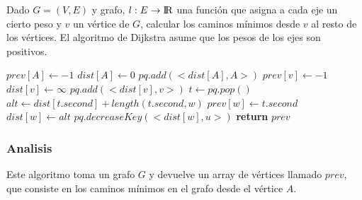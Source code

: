 Dado $G = (V, E)$ y grafo, $l: E \rightarrow {\rm I\!R}$ una funci\'on que asigna a cada eje un cierto peso y $v$ un v\'ertice de $G$, calcular los caminos m\'inimos desde $v$ al resto de los v\'ertices. El algoritmo de Dijkstra asume que los pesos de los ejes son positivos.

\begin{algorithm}
\begin{algorithmic}[1]
  \State $prev[A] \gets -1$
  \State $dist[A] \gets 0$
  \State $pq.add(<dist[A], A>)$
    \State $prev[v] \gets -1$
    \State $dist[v] \gets \infty$
    \State $pq.add(<dist[v], v>)$
  \EndFor
    \State $t \gets pq.pop()$
      \State $alt \gets dist[t.second] + length(t.second, w)$
        \State $prev[w] \gets t.second$
        \State $dist[w] \gets alt$
        \State $pq.decreaseKey(<dist[w], u>)$
      \EndIf
    \EndFor
  \EndWhile
  \State \textbf{return} $prev$
\EndFunction
\end{algorithmic}
\end{algorithm}

\subsubsection*{Analisis}

Este algoritmo toma un grafo $G$ y devuelve un array de v\'ertices llamado $prev$, que consiste en los caminos m\'inimos en el grafo desde el v\'ertice $A$.

